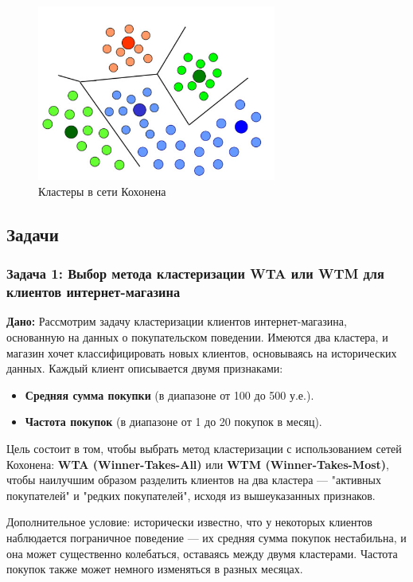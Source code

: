 \begin{figure}[h]
    \centering
    \includegraphics[width=0.7\textwidth]{chapters/clustering/images/clusters_kohonen.jpg}
    \caption{Кластеры в сети Кохонена}
\end{figure}

\subsection{Задачи}
\subsubsection{Задача 1: Выбор метода кластеризации WTA или WTM для клиентов интернет-магазина}

\textbf{Дано:}
Рассмотрим задачу кластеризации клиентов интернет-магазина, основанную на данных о покупательском поведении. Имеются два кластера, и магазин хочет классифицировать новых клиентов, основываясь на исторических данных. Каждый клиент описывается двумя признаками: 

\begin{itemize}
    \item \textbf{Средняя сумма покупки} (в диапазоне от 100 до 500 у.е.).
    \item \textbf{Частота покупок} (в диапазоне от 1 до 20 покупок в месяц).
\end{itemize}

Цель состоит в том, чтобы выбрать метод кластеризации с использованием сетей Кохонена: \textbf{WTA (Winner-Takes-All)} или \textbf{WTM (Winner-Takes-Most)}, чтобы наилучшим образом разделить клиентов на два кластера — "активных покупателей" и "редких покупателей", исходя из вышеуказанных признаков.

Дополнительное условие: исторически известно, что у некоторых клиентов наблюдается пограничное поведение — их средняя сумма покупок нестабильна, и она может существенно колебаться, оставаясь между двумя кластерами. Частота покупок также может немного изменяться в разных месяцах.


